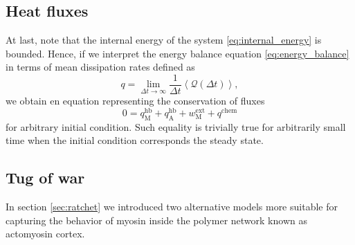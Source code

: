 \documentclass[aps,pre,twocolumn,showpacs,showkeys,superscriptaddress,floatfix]{revtex4-1}
\begin{document}
\subsection{Heat fluxes}
At last, note that the internal energy of the system \eqref{eq:internal_energy} is bounded.
Hence, if we interpret the energy balance equation \eqref{eq:energy_balance} in terms of mean dissipation rates defined as 
\begin{equation}
q = \lim_{\Delta t \to \infty} \frac{1}{\Delta t} \left\langle {\mathcal Q}(\Delta t) \right\rangle ,
\label{eq:heat_flux}
\end{equation}
we obtain en equation representing the conservation of fluxes 
\begin{equation}
0 = q_\text{M}^\text{hb} + q_\text{A}^\text{hb} + w^\text{ext}_\text{M} + q^\text{chem} 
\label{eq:heat_flux_balance}
\end{equation}
for arbitrary initial condition. 
Such equality is trivially true for arbitrarily small time when the initial condition corresponds the steady state. 


\subsection{Tug of war} 
In section \ref{sec:ratchet} we introduced two alternative models more suitable for capturing the behavior of myosin inside the polymer network known as actomyosin cortex.
\end{document}
